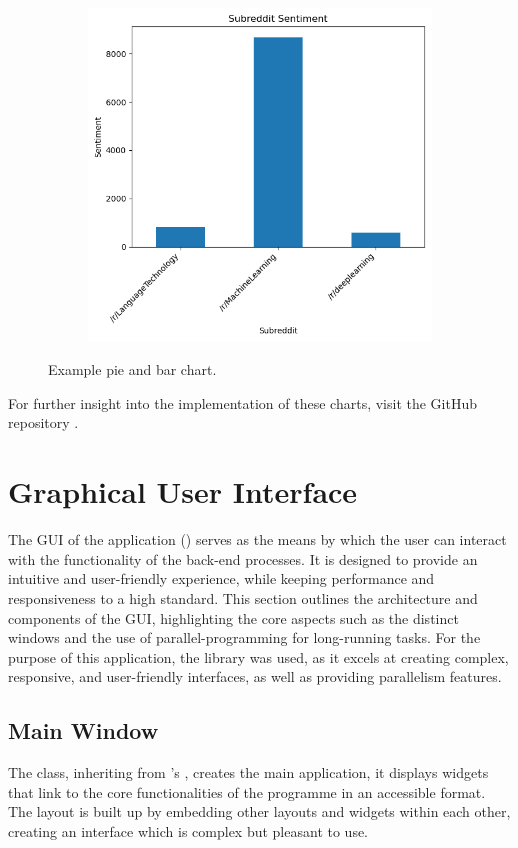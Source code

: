 \begin{figure}[h]
\begin{subfigure}{0.49\textwidth}
        \includegraphics[width=\textwidth]{figures/bar-chart.png}
    \end{subfigure}
    \caption{Example pie and bar chart.}
\end{figure}

For further insight into the implementation of these charts, visit the GitHub repository \citep{sentimentanalysistool}.

\section{Graphical User Interface}

The GUI of the application () serves as the means by which the user can interact with the functionality of the back-end processes. It is designed to provide an intuitive and user-friendly experience, while keeping performance and responsiveness to a high standard. This section outlines the architecture and components of the GUI, highlighting the core aspects such as the distinct windows and the use of parallel-programming for long-running tasks. For the purpose of this application, the  library was used, as it excels at creating complex, responsive, and user-friendly interfaces, as well as providing parallelism features.

    \subsection{Main Window}
    The  class, inheriting from 's , creates the main application, it displays widgets that link to the core functionalities of the programme in an accessible format. The layout is built up by embedding other layouts and widgets within each other, creating an interface which is complex but pleasant to use. 

